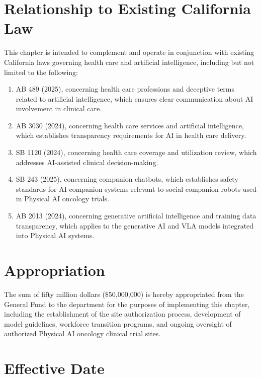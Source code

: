 \documentclass[11pt,letterpaper]{article}
\begin{document}
\section{Relationship to Existing California Law}

This chapter is intended to complement and operate in conjunction with
existing California laws governing health care and artificial intelligence,
including but not limited to the following:

\begin{enumerate}[label=(\alph*)]
\item AB 489 (2025), concerning health care professions and deceptive terms
  related to artificial intelligence, which ensures clear communication about
  AI involvement in clinical care.

\item AB 3030 (2024), concerning health care services and artificial
  intelligence, which establishes transparency requirements for AI in health
  care delivery.

\item SB 1120 (2024), concerning health care coverage and utilization review,
  which addresses AI-assisted clinical decision-making.

\item SB 243 (2025), concerning companion chatbots, which establishes safety
  standards for AI companion systems relevant to social companion robots used
  in Physical AI oncology trials.

\item AB 2013 (2024), concerning generative artificial intelligence and
  training data transparency, which applies to the generative AI and VLA
  models integrated into Physical AI systems.
\end{enumerate}

\section{Appropriation}

The sum of fifty million dollars (\$50,000,000) is hereby appropriated from the
General Fund to the department for the purposes of implementing this chapter,
including the establishment of the site authorization process, development of
model guidelines, workforce transition programs, and ongoing oversight of
authorized Physical AI oncology clinical trial sites.

\section{Effective Date}
\end{document}
